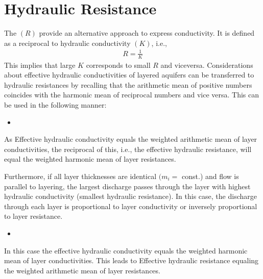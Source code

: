 \documentclass[letterpaper,10pt,english]{jupyterBook}
\begin{document}
\section{Hydraulic Resistance}
\label{\detokenize{content/flow/L5/15_het_iso:hydraulic-resistance}}
\sphinxAtStartPar
The  \((R)\) provide an alternative approach to express conductivity. It is defined as a reciprocal to hydraulic conductivity \((K)\), i.e.,
\begin{equation*}
\begin{split}
R = \frac{1}{K}
\end{split}
\end{equation*}
\sphinxAtStartPar
This implies that large \(K\) corresponds to small \(R\) and vice\sphinxhyphen{}versa. Considerations about effective hydraulic conductivities of layered
aquifers can be transferred to hydraulic resistances by recalling
that the arithmetic mean of positive numbers coincides with the
harmonic mean of reciprocal numbers and vice versa. This can be used in the following manner:
\begin{itemize}
\item {} 
\sphinxAtStartPar
{}

\end{itemize}

\sphinxAtStartPar
As Effective hydraulic conductivity equals the weighted arithmetic mean of layer conductivities, the reciprocal of this, i.e., the effective hydraulic resistance, will equal the weighted harmonic mean of layer resistances.

\sphinxAtStartPar
Furthermore, if all layer thicknesses are identical \((m_i =\) const.) and flow is parallel to layering, the largest discharge passes through the layer with
highest hydraulic conductivity (smallest hydraulic resistance). In this case, the discharge through each layer is proportional to layer conductivity or inversely proportional to layer resistance.
\begin{itemize}
\item {} 
\sphinxAtStartPar
{}

\end{itemize}

\sphinxAtStartPar
In this case the effective hydraulic conductivity equals the weighted harmonic
mean of layer conductivities. This leads to Effective hydraulic resistance equaling the weighted arithmetic mean of layer resistances.
\end{document}

